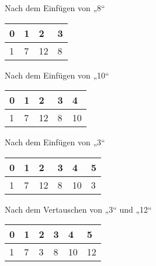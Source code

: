 \documentclass{bschlangaul-aufgabe}
\begin{document}
\begin{enumerate}
\begin{enumerate}
\begin{bBaum}{Nach dem Einfügen von „8“}
\begin{tabular}{llll}
\bf{0} & \bf{1} & \bf{2} & \bf{3} \\
\hline
1      & 7      & 12     & 8      \\
\end{tabular}

\end{bBaum}

\begin{bBaum}{Nach dem Einfügen von „10“}
\begin{tabular}{lllll}
\bf{0} & \bf{1} & \bf{2} & \bf{3} & \bf{4} \\
\hline
1      & 7      & 12     & 8      & 10     \\
\end{tabular}

\end{bBaum}

\begin{bBaum}{Nach dem Einfügen von „3“}
\begin{tabular}{llllll}
\bf{0} & \bf{1} & \bf{2} & \bf{3} & \bf{4} & \bf{5} \\
\hline
1      & 7      & 12     & 8      & 10     & 3      \\
\end{tabular}

\end{bBaum}

\begin{bBaum}{Nach dem Vertauschen von „3“ und „12“}
\begin{tabular}{llllll}
\bf{0} & \bf{1} & \bf{2} & \bf{3} & \bf{4} & \bf{5} \\
\hline
1      & 7      & 3      & 8      & 10     & 12     \\
\end{tabular}


\end{bBaum}
\end{enumerate}
\end{enumerate}
\end{document}
